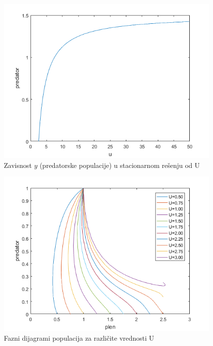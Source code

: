 \documentclass[a4paper]{article}
\begin{document}
\begin{figure}[H]
    \centering
    \begin{minipage}{0.75\textwidth}
        \centering
        \includegraphics[width=1\textwidth]{images/predator_vs_u} %
        \caption{Zavisnost $y$ (predatorske populacije) u stacionarnom rešenju od U}
    \end{minipage}
\end{figure}

\begin{figure}[H]
    \centering
    \begin{minipage}{0.75\textwidth}
        \centering
        \includegraphics[width=1\textwidth]{images/bunch_of_u} %
        \caption{Fazni dijagrami populacija za različite vrednosti U}
        \label{pic:many_u}
    \end{minipage}
\end{figure}
\end{document}

